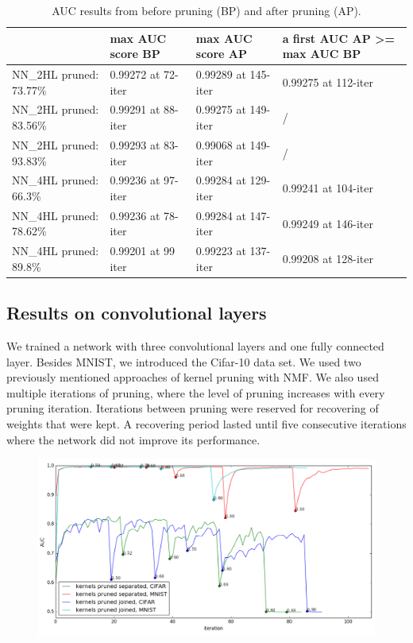 \documentclass{article} %
\begin{document}
\begin{table}[!ht]
\centering
\begin{tabular}{l|l|l|p{3cm}|}
\cline{2-4}
 & max AUC score BP & max AUC score AP & a first AUC AP \textgreater= max AUC BP 
\\ \hline
\multicolumn{1}{|l|}{NN\_2HL pruned: 73.77\%} & 0.99272 at 72-iter & 0.99289 at 
145-iter & 0.99275 at 112-iter \\ \hline
\multicolumn{1}{|l|}{NN\_2HL pruned: 83.56\%} & 0.99291 at 88-iter & 0.99275 at 
149-iter & / \\ \hline
\multicolumn{1}{|l|}{NN\_2HL pruned: 93.83\%} & 0.99293 at 83-iter & 0.99068 at 
149-iter & / \\ \hline
\multicolumn{1}{|l|}{NN\_4HL pruned: 66.3\%} & 0.99236 at 97-iter & 0.99284 at 
129-iter & 0.99241 at 104-iter \\ \hline
\multicolumn{1}{|l|}{NN\_4HL pruned: 78.62\%} & 0.99236 at 78-iter & 0.99284 at 
147-iter & 0.99249 at 146-iter \\ \hline
\multicolumn{1}{|l|}{NN\_4HL pruned: 89.8\%} & 0.99201 at 99 iter & 0.99223 at 
137-iter & 0.99208 at 128-iter \\ \hline
\end{tabular}
\caption{AUC results from before pruning (BP) and after pruning (AP).}
\label{t:results}
\end{table}


\subsection{Results on convolutional layers}

We trained a network with three convolutional layers and one fully connected layer. 
Besides MNIST, we introduced the Cifar-10 data set. We used two previously mentioned 
approaches of kernel pruning with NMF. We also used multiple iterations of pruning, where 
the level of pruning increases with every pruning iteration. Iterations between pruning 
were reserved for recovering of weights that were kept. A recovering period lasted until 
five consecutive iterations where the network did not improve its performance.  

\begin{figure}[!ht]
\centering
\includegraphics[width=1\linewidth]{auc_cnn.png}
\label{f:results_conv}
\end{figure}
\end{document}
